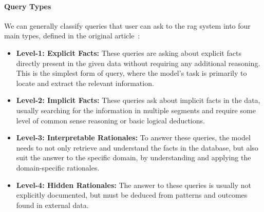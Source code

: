 
\paragraph{Query Types}
We can generally classify queries that user can ask to the \gls{rag} system into
four main types, defined in the original
article~\cite{zhao2024retrievalaugmentedgenerationrag}:

\begin{itemize}
  \item \textbf{Level-1: Explicit Facts:} These queries are asking
    about explicit facts
    directly present in the given data without requiring any additional
    reasoning. This is the simplest form of query, where the model’s task is
    primarily to locate and extract the relevant information.
  \item \textbf{Level-2: Implicit Facts:} These queries ask about implicit
    facts in the data, usually searching for the information in multiple
    segments and require some level of common sense reasoning or basic logical
    deductions.
  \item \textbf{Level-3: Interpretable Rationales:} To answer these queries,
    the model needs to not only retrieve and understand the facts in the
    database, but also suit the answer to the specific domain, by
    understanding and applying the domain-specific rationales.
  \item \textbf{Level-4: Hidden Rationales:} The answer to these queries is
    usually not explicitly documented, but must be deduced from patterns and
    outcomes found in external data.
\end{itemize}

